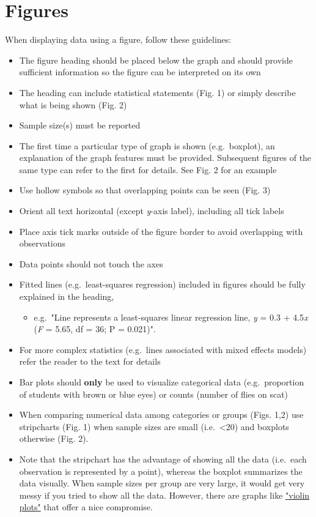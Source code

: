 \documentclass[
]{book}
\providecommand{\tightlist}{%
  \setlength{\itemsep}{0pt}\setlength{\parskip}{0pt}}
\begin{document}
\section{Figures}\label{figures}

When displaying data using a figure, follow these guidelines:

\begin{itemize}
\tightlist
\item
  The figure heading should be placed below the graph and should provide sufficient information so the figure can be interpreted on its own
\item
  The heading can include statistical statements (Fig. 1) or simply describe what is being shown (Fig. 2)
\item
  Sample size(s) must be reported
\item
  The first time a particular type of graph is shown (e.g.~boxplot), an explanation of the graph features must be provided. Subsequent figures of the same type can refer to the first for details. See Fig. 2 for an example
\item
  Use hollow symbols so that overlapping points can be seen (Fig. 3)
\item
  Orient all text horizontal (except \emph{y}-axis label), including all tick labels
\item
  Place axis tick marks outside of the figure border to avoid overlapping with observations
\item
  Data points should not touch the axes
\item
  Fitted lines (e.g.~least-squares regression) included in figures should be fully explained in the heading,

  \begin{itemize}
  \tightlist
  \item
    e.g.~"Line represents a least-squares linear regression line, \emph{y} = 0.3 + 4.5\emph{x} (\emph{F} = 5.65, df = 36; P = 0.021)".
  \end{itemize}
\item
  For more complex statistics (e.g.~lines associated with mixed effects models) refer the reader to the text for details
\item
  Bar plots should \textbf{only} be used to visualize categorical data (e.g.~proportion of students with brown or blue eyes) or counts (number of flies on scat)
\item
  When comparing numerical data among categories or groups (Figs. 1,2) use stripcharts (Fig. 1) when sample sizes are small (i.e.~\textless20) and boxplots otherwise (Fig. 2).
\item
  Note that the stripchart has the advantage of showing all the data (i.e.~each observation is represented by a point), whereas the boxplot summarizes the data visually. When sample sizes per group are very large, it would get very messy if you tried to show all the data. However, there are graphs like \href{https://www.r-graph-gallery.com/violin.html}{"violin plots"} that offer a nice compromise.
\end{itemize}
\end{document}

